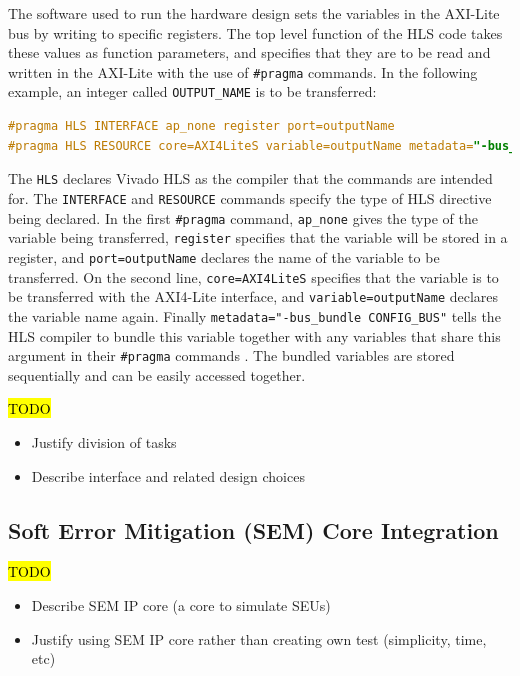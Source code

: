 \documentclass[12pt]{article}
\begin{document}
The software used to run the hardware design sets the variables in the AXI-Lite bus by writing to specific registers. The top level function of the HLS code takes these values as function parameters, and specifies that they are to be read and written in the AXI-Lite with the use of \lstinline|#pragma| commands. In the following example, an integer called \lstinline|OUTPUT_NAME| is to be transferred:

\begin{lstlisting}[language=C,deletekeywords={register}]
#pragma HLS INTERFACE ap_none register port=outputName
#pragma HLS RESOURCE core=AXI4LiteS variable=outputName metadata="-bus_bundle CONFIG_BUS"
\end{lstlisting}

The \lstinline|HLS| declares Vivado HLS as the compiler that the commands are intended for. The \lstinline|INTERFACE| and \lstinline|RESOURCE| commands specify the type of HLS directive being declared. In the first \lstinline|#pragma| command, \lstinline|ap_none| gives the type of the variable being transferred, \lstinline|register| specifies that the variable will be stored in a register, and \lstinline|port=outputName| declares the name of the variable to be transferred. On the second line, \lstinline|core=AXI4LiteS| specifies that the variable is to be transferred with the AXI4-Lite interface, and \lstinline|variable=outputName| declares the variable name again. Finally \lstinline|metadata="-bus_bundle CONFIG_BUS"| tells the HLS compiler to bundle this variable together with any variables that share this argument in their \lstinline|#pragma| commands . The bundled variables are stored sequentially and can be easily accessed together.

\hl{TODO}

\begin{itemize}
\item Justify division of tasks
\item Describe interface and related design choices
\end{itemize}

\subsection{Soft Error Mitigation (SEM) Core Integration}
\label{sec:Design-SEM}

\hl{TODO}

\begin{itemize}
\item Describe SEM IP core (a core to simulate SEUs)
\item Justify using SEM IP core rather than creating own test (simplicity, time, etc)
\end{itemize}
\end{document}
